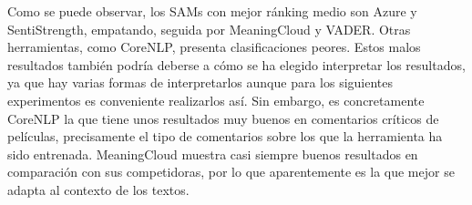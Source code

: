 \begin{table} [H]

\caption{Tabla con los ránkings de cada herramienta en cada conjunto de comentarios}
	\label{tablaranking}
\end{table}

Como se puede observar, los SAMs con mejor ránking medio son Azure y SentiStrength, empatando, seguida por MeaningCloud y VADER. Otras herramientas, como CoreNLP, presenta clasificaciones peores. Estos malos resultados también podría deberse a cómo se ha elegido interpretar los resultados, ya que hay varias formas de interpretarlos aunque para los siguientes experimentos es conveniente realizarlos así. Sin embargo, es concretamente CoreNLP la que tiene unos resultados muy buenos en comentarios críticos de películas, precisamente el tipo de comentarios sobre los que la herramienta ha sido entrenada. MeaningCloud muestra casi siempre buenos resultados en comparación con sus competidoras, por lo que aparentemente es la que mejor se adapta al contexto de los textos.

